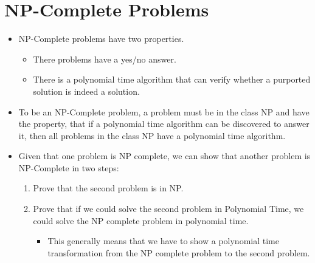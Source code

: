 \documentclass[12pt]{scrartcl}
\begin{document}
\section{NP-Complete Problems}
\begin{itemize}
    \item NP-Complete problems have two properties.
        \begin{itemize}
            \item There problems have a yes/no answer.
            \item There is a polynomial time algorithm that can verify whether a purported solution is indeed a solution.
        \end{itemize}

    \item To be an NP-Complete problem, a problem must be in the class NP and have the property, that if a polynomial time algorithm can be discovered to answer it, then all problems in the class NP have a polynomial time algorithm.

    \item Given that one problem is NP complete, we can show that another problem is NP-Complete in two steps:
        \begin{enumerate}
            \item Prove that the second problem is in NP\@.
            \item Prove that if we could solve the second problem in Polynomial Time, we could solve the NP complete problem in polynomial time.
                \begin{itemize}
                    \item This generally means that we have to show a polynomial time transformation from the NP complete problem to the second problem.
                \end{itemize}
       \end{enumerate}

\end{itemize}
\end{document}
